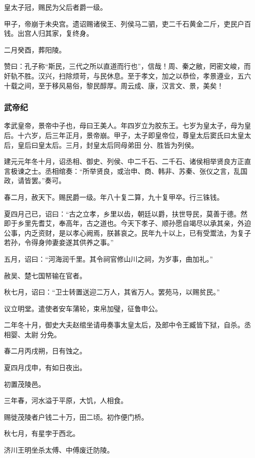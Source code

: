 \documentclass[]{article}
\begin{document}
皇太子冠，赐民为父后者爵一级。

甲子，帝崩于未央宫。遗诏赐诸侯王、列侯马二驷，吏二千石黄金二斤，吏民户百钱。出宫人归其家，复终身。

二月癸酉，葬阳陵。

赞曰：孔子称``斯民，三代之所以直道而行也''，信哉！周、秦之敝，罔密文峻，而奸轨不胜。汉兴，扫除烦苛，与民休息。至于孝文，加之以恭俭，孝景遵业，五六十载之间，至于移风易俗，黎民醇厚。周云成、康，汉言文、景，美矣！

\hypertarget{header-n372}{%
\subsubsection{武帝纪}\label{header-n372}}

孝武皇帝，景帝中子也，母曰王美人。年四岁立为胶东王。七岁为皇太子，母为皇后。十六岁，后三年正月，景帝崩。甲子，太子即皇帝位，尊皇太后窦氏曰太皇太后，皇后曰皇太后。三月，封皇太后同母弟田分、胜皆为列侯。

建元元年冬十月，诏丞相、御史、列侯、中二千石、二千石、诸侯相举贤良方正直言极谏之士。丞相绾奏：``所举贤良，或治申、商、韩非、苏秦、张仪之言，乱国政，请皆罢。''奏可。

春二月，赦天下。赐民爵一级。年八十复二算，九十复甲卒。行三铢钱。

夏四月己已，诏曰：``古之立孝，乡里以齿，朝廷以爵，扶世导民，莫善于德。然即于乡里先耆艾，奉高年，古之道也。今天下孝子、顺孙愿自竭尽以承其亲，外迫公事，内乏资财，是以孝心阙焉，朕甚哀之。民年九十以上，已有受鬻法，为复子若孙，令得身帅妻妾遂其供养之事。''

五月，诏曰：``河海润千里。其令祠官修山川之祠，为岁事，曲加礼。''

赦吴、楚七国帑输在官者。

秋七月，诏曰：``卫士转置送迎二万人，其省万人。罢苑马，以赐贫民。''

议立明堂。遣使者安车蒲轮，束帛加璧，征鲁申公。

二年冬十月，御史大夫赵绾坐请毋奏事太皇太后，及郎中令王臧皆下狱，自杀。丞相婴、太尉分免。

春二月丙戌朔，日有蚀之。

夏四月戊申，有如日夜出。

初置茂陵邑。

三年春，河水溢于平原，大饥，人相食。

赐徙茂陵者户钱二十万，田二顷。初作便门桥。

秋七月，有星孛于西北。

济川王明坐杀太傅、中傅废迁防陵。
\end{document}
